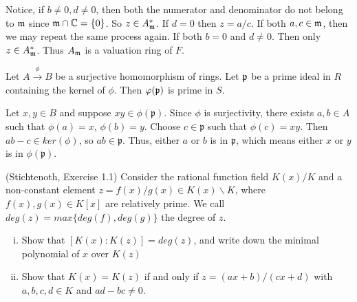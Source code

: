 \begin{solution}
	Notice, if $b\neq 0, d \neq 0$, then both the numerator and denominator 
	do not belong to
	$\mathfrak{m}$ since $\mathfrak{m} \cap \mathbb{C} = \lbrace 0 \rbrace$. So $z \in A_{\mathfrak{m}}^*$.
	If $d = 0$ then $z = a/c$. If both $a,c\in \mathfrak{m}$, then we
	may repeat the same process again. If both $b = 0$ and $d \neq 0$. 
	Then only $z \in A_{\mathfrak{m}}^*$. Thus $A_{\mathfrak{m}} $ is a valuation ring of $F$.
\end{solution}

\begin{exercise} \label{primeontoprime}
Let $A \stackrel{\phi}{\longrightarrow} B$ be a surjective homomorphism of rings. 
Let $\mathfrak{p} $ be a prime ideal in $R$ containing the kernel of $\phi$. 
Then $\varphi(\mathfrak{p})$ is prime in $S$.
\end{exercise}

\begin{solution} 
Let $x,y \in B$ and suppose $xy \in \phi(\mathfrak{p})$. Since $\phi$ is 
surjectivity, there exists $a, b \in A$ such that $\phi(a)= x$, $\phi(b)=y$. 
Choose $c \in \mathfrak{p}$ such that $\phi(c) = xy$.  
Then $ab -c \in ker(\phi)$, so $ab \in \mathfrak{p}$.  
Thus, either $a$ or $b$ is in $\mathfrak{p}$, which means 
either $x$ or $y$ is in $\phi(\mathfrak{p})$.
\end{solution}

    
\begin{exercise}(Stichtenoth, Exercise 1.1)
Consider the rational function field $K(x)/K$ and a non-constant element 
$z = f(x)/g(x) \in K(x) \backslash K$, where $f(x),g(x) \in K[x]$ are 
relatively prime. We call $deg(z) = max \lbrace deg(f) , deg(g) \rbrace $ 
the degree of $z$.
\begin{enumerate}[(i)]
\item Show that $[K(x): K(z)] = deg(z)$, and write down the minimal 
polynomial of $x$ over $K(z)$
\item Show that $K(x)=K(z) $ if and only if $z = (ax+b)/(cx+d)$ with
$a,b,c,d \in K$ and $ad - bc \neq 0$.
\end{enumerate}
\end{exercise}

